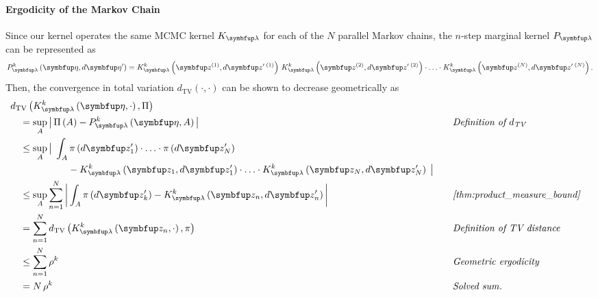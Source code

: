 \begin{proofEnd}
  \paragraph{Ergodicity of the Markov Chain}
  Since our kernel operates the same MCMC kernel \(K_{\vlambda}\) for each of the \(N\) parallel Markov chains, the \(n\)-step marginal kernel \(P_{\vlambda}\) can be represented as
  \begin{align*}
    P_{\vlambda}^k\left(\veta, d\veta^{\prime}\right)
    = 
    K_{\vlambda}^k\left(\vz^{(1)}, d\vz^{\prime\; (1)}\right)
    \,
    K_{\vlambda}^k\left(\vz^{(2)}, d\vz^{\prime\; (2)}\right)
    \cdot
    \ldots 
    \cdot
    K_{\vlambda}^k\left(\vz^{(N)}, d\vz^{\prime\; (N)}\right).
  \end{align*}
  Then, the convergence in total variation \(d_{\mathrm{TV}}\left(\cdot, \cdot\right)\) can be shown to decrease geometrically as
  \begin{alignat}{2}
    &\DTV{K^{k}_{\vlambda}\left(\veta, \cdot\right)}{\Pi}
    \nonumber
    \\
    &\quad=
    \sup_{A}
    \abs{
      \Pi\left(A\right)
      -
      P^{k}_{\vlambda}\left(\veta, A\right)
    }
    &&\quad\text{\textit{Definition of \(d_{\text{TV}}\)}}
    \nonumber
    \\
    &\quad\leq
    \sup_{A}
    \big|\;
    \int_{A}
      \pi\left(d\vz^{\prime}_1\right) \cdot \ldots \cdot \pi\left(d\vz^{\prime}_N\right)
    \nonumber
      \\
      &\qquad\qquad\qquad-
      K^k_{\vlambda}\left(\vz_1, d\vz^{\prime}_1\right) \cdot \ldots \cdot K^k_{\vlambda}\left(\vz_N, d\vz^{\prime}_N\right)
    \;\big|
    \nonumber
    \\
    &\quad\leq
    \sup_{A}
    \sum_{n=1}^N
    \abs{
    \int_{A}
      \pi\left(d\vz^{\prime}_k\right) - K^{k}_{\vlambda}\left(\vz_n, d\vz^{\prime}_n\right) 
    }
    &&\quad\text{\textit{\cref{thm:product_measure_bound}}}
    \nonumber
    \\
    &\quad=
    \sum_{n=1}^N
    \DTV{K^k_{\vlambda}\left(\vz_n, \cdot\right)}{\pi}
    &&\quad\text{\textit{Definition of TV distance}}
    \nonumber
    \\
    &\quad\leq
    \sum_{n=1}^N
    \rho^{k}
    &&\quad\text{\textit{Geometric ergodicity}}
    \nonumber
    \\
    &\quad=
    N\,\rho^{k}
    &&\quad\text{\textit{Solved sum}}.
    \nonumber
  \end{alignat}


\end{proofEnd}
